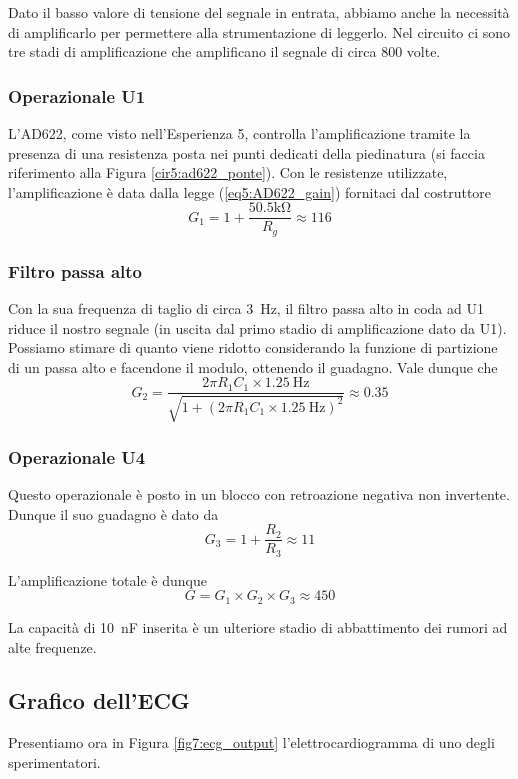 Dato il basso valore di tensione del segnale in entrata, abbiamo anche la necessità di amplificarlo per permettere alla strumentazione di leggerlo. Nel circuito ci sono tre stadi di amplificazione che amplificano il segnale di circa 800 volte.

\subsubsection*{Operazionale U1}
L'AD622, come visto nell'Esperienza 5, controlla l'amplificazione tramite la presenza di una resistenza posta nei punti dedicati della piedinatura (si faccia riferimento alla Figura \ref{cir5:ad622_ponte}). Con le resistenze utilizzate, l'amplificazione è data dalla legge (\ref{eq5:AD622_gain}) fornitaci dal costruttore
$$G_1=1+\frac{50.5 \si{\kilo\ohm}}{R_g} \approx 116$$

\subsubsection*{Filtro passa alto}
Con la sua frequenza di taglio di circa \SI{3}{\Hz}, il filtro passa alto in coda ad U1 riduce il nostro segnale (in uscita dal primo stadio di amplificazione dato da U1). Possiamo stimare di quanto viene ridotto considerando la funzione di partizione di un passa alto e facendone il modulo, ottenendo il guadagno. Vale dunque che
$$G_2=\frac{2 \pi R_1 C_1 \times \SI{1.25}{\Hz}}{\sqrt{1+(2 \pi R_1 C_1 \times \SI{1.25}{\Hz})^2}}\approx 0.35$$

\subsubsection*{Operazionale U4}
Questo operazionale è posto in un blocco con retroazione negativa non invertente. Dunque il suo guadagno è dato da
$$G_3=1+\frac{R_2}{R_3} \approx 11$$

L'amplificazione totale è dunque
$$G = G_1 \times G_2 \times G_3 \approx 450$$

La capacità di \SI{10}{\nano\farad} inserita è un ulteriore stadio di abbattimento dei rumori ad alte frequenze.

\subsection{Grafico dell'ECG}

Presentiamo ora in Figura \ref{fig7:ecg_output} l'elettrocardiogramma di uno degli sperimentatori.


